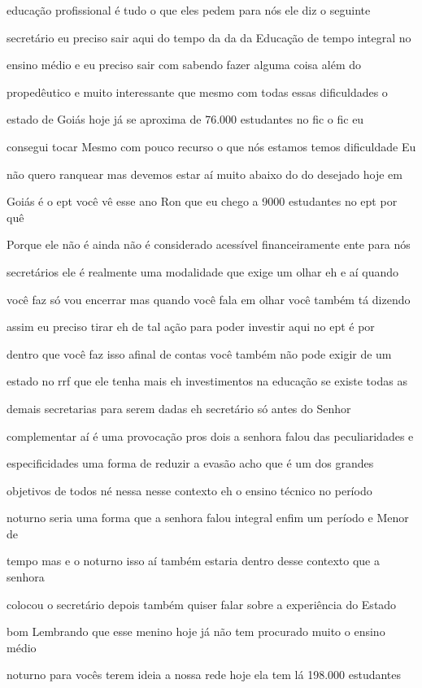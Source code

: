 \documentclass[a4paper,12pt]{article}
\begin{document}
educação profissional é tudo o que eles pedem para nós ele diz o seguinte

secretário eu preciso sair aqui do tempo da da da Educação de tempo integral no

ensino médio e eu preciso sair com sabendo fazer alguma coisa além do

propedêutico e muito interessante que mesmo com todas essas dificuldades o

estado de Goiás hoje já se aproxima de 76.000 estudantes no fic o fic eu

consegui tocar Mesmo com pouco recurso o que nós estamos temos dificuldade Eu

não quero ranquear mas devemos estar aí muito abaixo do do desejado hoje em

Goiás é o ept você vê esse ano Ron que eu chego a 9000 estudantes no ept por quê

Porque ele não é ainda não é considerado acessível financeiramente ente para nós

secretários ele é realmente uma modalidade que exige um olhar eh e aí quando

você faz só vou encerrar mas quando você fala em olhar você também tá dizendo

assim eu preciso tirar eh de tal ação para poder investir aqui no ept é por

dentro que você faz isso afinal de contas você também não pode exigir de um

estado no rrf que ele tenha mais eh investimentos na educação se existe todas as

demais secretarias para serem dadas eh secretário só antes do Senhor

complementar aí é uma provocação pros dois a senhora falou das peculiaridades e

especificidades uma forma de reduzir a evasão acho que é um dos grandes

objetivos de todos né nessa nesse contexto eh o ensino técnico no período

noturno seria uma forma que a senhora falou integral enfim um período e Menor de

tempo mas e o noturno isso aí também estaria dentro desse contexto que a senhora

colocou o secretário depois também quiser falar sobre a experiência do Estado

bom Lembrando que esse menino hoje já não tem procurado muito o ensino médio

noturno para vocês terem ideia a nossa rede hoje ela tem lá 198.000 estudantes
\end{document}
